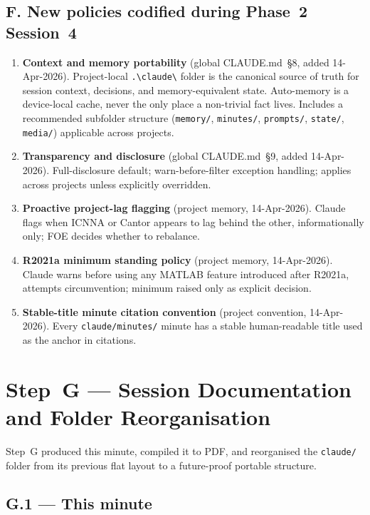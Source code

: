 \documentclass[11pt,a4paper]{article}
\begin{document}
\subsection{F. New policies codified during Phase~2 Session~4}

\begin{enumerate}
    \item \textbf{Context and memory portability} (global CLAUDE.md~§8, added 14-Apr-2026). Project-local \texttt{.\textbackslash claude\textbackslash} folder is the canonical source of truth for session context, decisions, and memory-equivalent state. Auto-memory is a device-local cache, never the only place a non-trivial fact lives. Includes a recommended subfolder structure (\texttt{memory/}, \texttt{minutes/}, \texttt{prompts/}, \texttt{state/}, \texttt{media/}) applicable across projects.
    \item \textbf{Transparency and disclosure} (global CLAUDE.md~§9, added 14-Apr-2026). Full-disclosure default; warn-before-filter exception handling; applies across projects unless explicitly overridden.
    \item \textbf{Proactive project-lag flagging} (project memory, 14-Apr-2026). Claude flags when ICNNA or Cantor appears to lag behind the other, informationally only; FOE decides whether to rebalance.
    \item \textbf{R2021a minimum standing policy} (project memory, 14-Apr-2026). Claude warns before using any MATLAB feature introduced after R2021a, attempts circumvention; minimum raised only as explicit decision.
    \item \textbf{Stable-title minute citation convention} (project convention, 14-Apr-2026). Every \texttt{claude/minutes/} minute has a stable human-readable title used as the anchor in citations.
\end{enumerate}

\section{Step~G --- Session Documentation and Folder Reorganisation}

Step~G produced this minute, compiled it to PDF, and reorganised the \texttt{claude/} folder from its previous flat layout to a future-proof portable structure.

\subsection{G.1 --- This minute}
\end{document}
